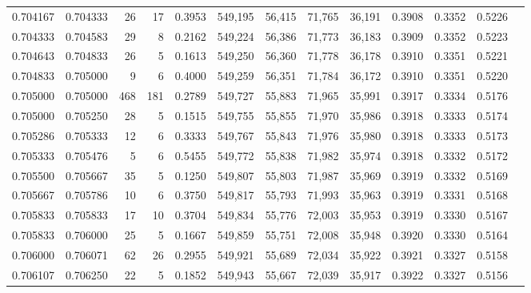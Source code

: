 \begin{tabular}{rrrrrrrrrrrrr}
0.704167 & 0.704333 &    26 &  17 &                                     0.3953 & 549,195 &  56,415 &  71,765 &  36,191 & 0.3908 & 0.3352 & 0.5226 \\
0.704333 & 0.704583 &    29 &   8 &                                     0.2162 & 549,224 &  56,386 &  71,773 &  36,183 & 0.3909 & 0.3352 & 0.5223 \\
0.704643 & 0.704833 &    26 &   5 &                                     0.1613 & 549,250 &  56,360 &  71,778 &  36,178 & 0.3910 & 0.3351 & 0.5221 \\
0.704833 & 0.705000 &     9 &   6 &                                     0.4000 & 549,259 &  56,351 &  71,784 &  36,172 & 0.3910 & 0.3351 & 0.5220 \\
0.705000 & 0.705000 &   468 & 181 &                                     0.2789 & 549,727 &  55,883 &  71,965 &  35,991 & 0.3917 & 0.3334 & 0.5176 \\
0.705000 & 0.705250 &    28 &   5 &                                     0.1515 & 549,755 &  55,855 &  71,970 &  35,986 & 0.3918 & 0.3333 & 0.5174 \\
0.705286 & 0.705333 &    12 &   6 &                                     0.3333 & 549,767 &  55,843 &  71,976 &  35,980 & 0.3918 & 0.3333 & 0.5173 \\
0.705333 & 0.705476 &     5 &   6 &                                     0.5455 & 549,772 &  55,838 &  71,982 &  35,974 & 0.3918 & 0.3332 & 0.5172 \\
0.705500 & 0.705667 &    35 &   5 &                                     0.1250 & 549,807 &  55,803 &  71,987 &  35,969 & 0.3919 & 0.3332 & 0.5169 \\
0.705667 & 0.705786 &    10 &   6 &                                     0.3750 & 549,817 &  55,793 &  71,993 &  35,963 & 0.3919 & 0.3331 & 0.5168 \\
0.705833 & 0.705833 &    17 &  10 &                                     0.3704 & 549,834 &  55,776 &  72,003 &  35,953 & 0.3919 & 0.3330 & 0.5167 \\
0.705833 & 0.706000 &    25 &   5 &                                     0.1667 & 549,859 &  55,751 &  72,008 &  35,948 & 0.3920 & 0.3330 & 0.5164 \\
0.706000 & 0.706071 &    62 &  26 &                                     0.2955 & 549,921 &  55,689 &  72,034 &  35,922 & 0.3921 & 0.3327 & 0.5158 \\
0.706107 & 0.706250 &    22 &   5 &                                     0.1852 & 549,943 &  55,667 &  72,039 &  35,917 & 0.3922 & 0.3327 & 0.5156 \\

\end{tabular}
